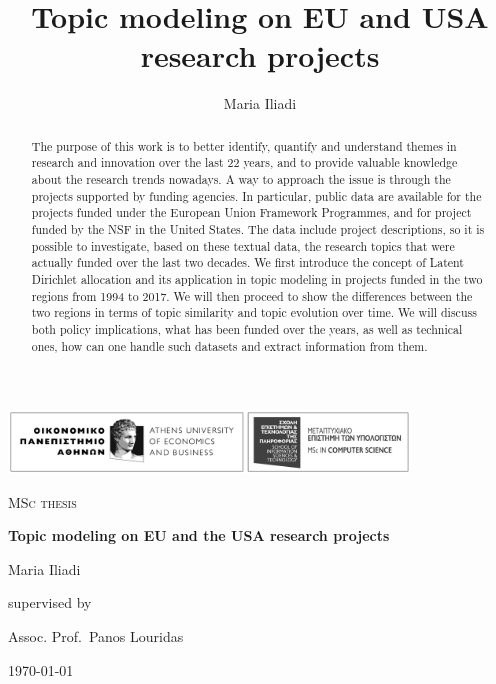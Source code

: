 \documentclass[12pt]{report}
\title{Topic modeling on EU and USA research projects}
\author{Maria Iliadi}
\begin{document}
\begin{titlepage}
	\centering
	\includegraphics[width=0.8\textwidth]{figs/logo.jpg}\par\vspace{4cm}
	{\scshape\Large MSc thesis\par}
	\vspace{1.5cm}
	{\Large\bfseries Topic modeling on EU and the USA research projects\par}
	\vspace{2cm}
	{\Large Maria Iliadi\par}
	\vfill
	supervised by\par
	Assoc. Prof.~Panos Louridas

	\vfill

	{\large \today\par}
\end{titlepage}
\tableofcontents

\begin{abstract}
The purpose of this work is to better identify, quantify and understand themes
in research and innovation over the last 22 years, and to provide valuable
knowledge about the research trends nowadays. A way to approach the issue is
through the projects supported by funding agencies. In particular, public data
are available for the projects funded under the European Union Framework
Programmes, and for project funded by the NSF in the United States. The data
include project descriptions, so it is possible to investigate, based on these
textual data, the research topics that were actually funded over the last two
decades. We first introduce the concept of Latent Dirichlet allocation and its
application in topic modeling in projects funded in the two regions from 1994
to 2017. We will then proceed to show the differences between the two regions in
terms of topic similarity and topic evolution over time. We will discuss both
policy implications, what has been funded over the years, as well as technical
ones, how can one handle such datasets and extract information from them.
\end{abstract}
\end{document}
